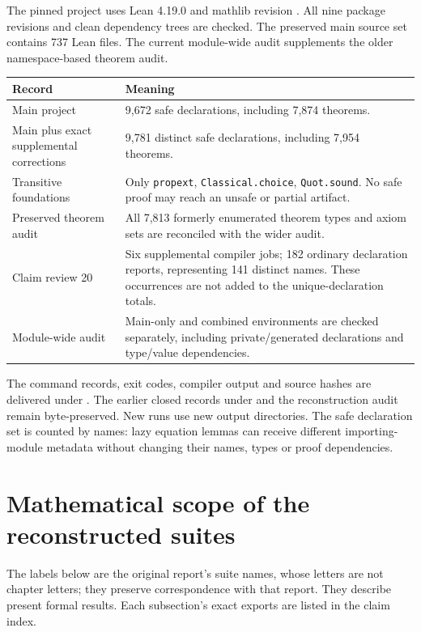 The pinned project uses Lean 4.19.0 and mathlib revision
.
All nine package revisions and clean dependency trees are checked. The preserved main source set contains 737 Lean files. The current module-wide audit supplements the older namespace-based theorem audit.

\begin{longtable}{@{}p{}p{}@{}}
\toprule Record & Meaning\\\midrule\endhead
Main project & 9,672 safe declarations, including 7,874 theorems.\\
Main plus exact supplemental corrections & 9,781 distinct safe declarations, including 7,954 theorems.\\
Transitive foundations & Only \texttt{propext}, \texttt{Classical.choice}, \texttt{Quot.sound}. No safe proof may reach an unsafe or partial artifact.\\
Preserved theorem audit & All 7,813 formerly enumerated theorem types and axiom sets are reconciled with the wider audit.\\
Claim review 20 & Six supplemental compiler jobs; 182 ordinary declaration reports, representing 141 distinct names. These occurrences are not added to the unique-declaration totals.\\
Module-wide audit & Main-only and combined environments are checked separately, including private/generated declarations and type/value dependencies.\\
\bottomrule\end{longtable}

The command records, exit codes, compiler output and source hashes are delivered under . The earlier closed records under  and the reconstruction audit remain byte-preserved. New runs use new output directories. The safe declaration set is counted by names: lazy equation lemmas can receive different importing-module metadata without changing their names, types or proof dependencies.



\section{Mathematical scope of the reconstructed suites}\label{what-each-suite-actually-checks}

The labels below are the original report's suite names, whose letters are not chapter letters; they preserve correspondence with that report. They describe present formal results. Each subsection's exact exports are listed in the claim index.

